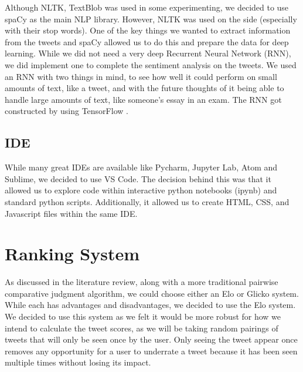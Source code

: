 	
	
	Although NLTK, TextBlob was used in some experimenting, we decided to use spaCy as the main NLP library. However, NLTK was used on the side (especially with their stop words). One of the key things we wanted to extract information from the tweets and spaCy allowed us to do this and prepare the data for deep learning. While we did not need a very deep Recurrent Neural Network (RNN), we did implement one to complete the sentiment analysis on the tweets. We used an RNN with two things in mind, to see how well it could perform on small amounts of text, like a tweet, and with the future thoughts of it being able to handle large amounts of text, like someone's essay in an exam. The RNN got constructed by using TensorFlow \cite{tensorflow2015-whitepaper}.
	
	\subsection{IDE}
	While many great IDEs are available like Pycharm, Jupyter Lab, Atom and Sublime, we decided to use VS Code. The decision behind this was that it allowed us to explore code within interactive python notebooks (ipynb) and standard python scripts. Additionally, it allowed us to create HTML, CSS, and Javascript files within the same IDE.
	
	
	\section{Ranking System}
	
	As discussed in the literature review, along with a more traditional pairwise comparative judgment algorithm, we could choose either an Elo or Glicko system. While each has advantages and disadvantages, we decided to use the Elo system. We decided to use this system as we felt it would be more robust for how we intend to calculate the tweet scores, as we will be taking random pairings of tweets that will only be seen once by the user. Only seeing the tweet appear once removes any opportunity for a user to underrate a tweet because it has been seen multiple times without losing its impact. 
	
